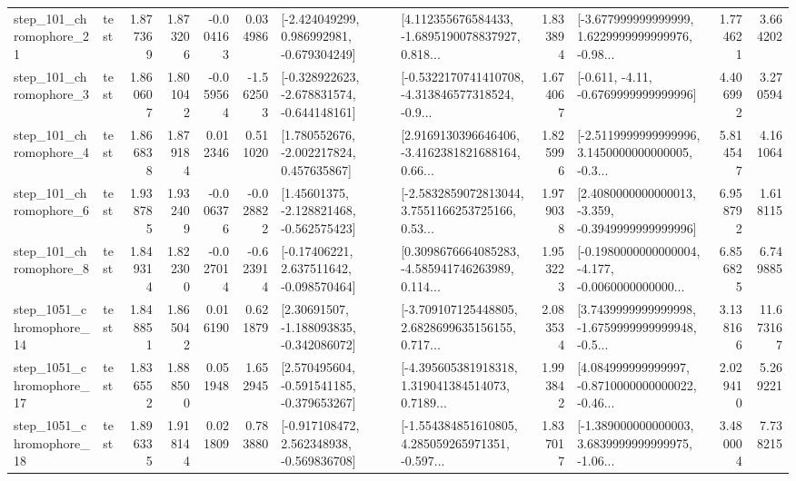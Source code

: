 \begin{tabular}{llrrrrllrlrr}
  step\_101\_chromophore\_21 &      test &      1.877369 &    1.873206 &     -0.004163 &  0.034986 &   [-2.424049299, 0.986992981, -0.679304249] &  [4.112355676584433, -1.6895190078837927, 0.818... &       1.833894 &  [-3.677999999999999, 1.6229999999999976, -0.98... &            1.774621 &          3.664202 \\
   step\_101\_chromophore\_3 &      test &      1.860607 &    1.801042 &     -0.059564 & -1.562503 &  [-0.328922623, -2.678831574, -0.644148161] &  [-0.5322170741410708, -4.313846577318524, -0.9... &       1.674067 &               [-0.611, -4.11, -0.6769999999999996] &            4.406992 &          3.270594 \\
   step\_101\_chromophore\_4 &      test &      1.866838 &    1.879184 &      0.012346 &  0.511020 &    [1.780552676, -2.002217824, 0.457635867] &  [2.9169130396646406, -3.4162381821688164, 0.66... &       1.825996 &  [-2.5119999999999996, 3.1450000000000005, -0.3... &            5.814547 &          4.161064 \\
   step\_101\_chromophore\_6 &      test &      1.938785 &    1.932409 &     -0.006376 & -0.028822 &    [1.45601375, -2.128821468, -0.562575423] &  [-2.5832859072813044, 3.7551166253725166, 0.53... &       1.979038 &  [2.4080000000000013, -3.359, -0.3949999999999996] &            6.958792 &          1.618115 \\
   step\_101\_chromophore\_8 &      test &      1.849314 &    1.822300 &     -0.027014 & -0.623914 &    [-0.17406221, 2.637511642, -0.098570464] &  [0.3098676664085283, -4.585941746263989, 0.114... &       1.953223 &  [-0.1980000000000004, -4.177, -0.0060000000000... &            6.856825 &          6.749885 \\
 step\_1051\_chromophore\_14 &      test &      1.848851 &    1.865042 &      0.016190 &  0.621879 &    [2.30691507, -1.188093835, -0.342086072] &  [-3.709107125448805, 2.6828699635156155, 0.717... &       2.083534 &  [3.7439999999999998, -1.6759999999999948, -0.5... &            3.138166 &         11.673167 \\
 step\_1051\_chromophore\_17 &      test &      1.836552 &    1.888500 &      0.051948 &  1.652945 &   [2.570495604, -0.591541185, -0.379653267] &  [-4.395605381918318, 1.319041384514073, 0.7189... &       1.993842 &  [4.084999999999997, -0.8710000000000022, -0.46... &            2.029410 &          5.269221 \\
 step\_1051\_chromophore\_18 &      test &      1.896335 &    1.918144 &      0.021809 &  0.783880 &   [-0.917108472, 2.562348938, -0.569836708] &  [-1.554384851610805, 4.285059265971351, -0.597... &       1.837017 &  [-1.389000000000003, 3.6839999999999975, -1.06... &            3.480004 &          7.738215 \\

\end{tabular}
